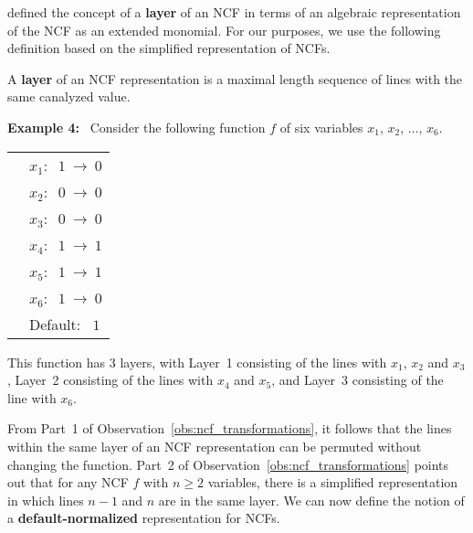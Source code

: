 \citet{Li-etal-2013} defined the concept of a 
{\bf layer} of an NCF in terms of
an algebraic representation of the NCF as an extended monomial.
For our purposes, we use the following definition based on the
simplified representation of NCFs.

\begin{definition}
\label{def:layer}
A {\bf layer} of an NCF representation is a maximal length sequence 
of lines with the same canalyzed value.
\end{definition}

\noindent
\textbf{Example 4:}~ Consider the following function $f$ of six variables
$x_1$, $x_2$, $\ldots$, $x_6$. 

\bigskip

\noindent
\begin{tabular}{ll}
\hspace*{0.25in} & $x_1:~$  $1 ~\longrightarrow~ 0$ \\ [0.5ex]
\hspace*{0.25in} & $x_2:~$  $0 ~\longrightarrow~ 0$ \\ [0.5ex]
\hspace*{0.25in} & $x_3:~$  $0 ~\longrightarrow~ 0$ \\ [0.5ex]
\hspace*{0.25in} & $x_4:~$  $1 ~\longrightarrow~ 1$ \\ [0.5ex]
\hspace*{0.25in} & $x_5:~$  $1 ~\longrightarrow~ 1$ \\ [0.5ex]
\hspace*{0.25in} & $x_6:~$  $1 ~\longrightarrow~ 0$ \\ [0.5ex]
\hspace*{0.25in} & Default:~ $1$ \\
\end{tabular}

\medskip
\noindent
This function has 3 layers, with 
Layer~1 consisting of the lines with $x_1$, $x_2$ and $x_3$, 
Layer~2 consisting of the lines with $x_4$ and $x_5$, and
Layer~3 consisting of the line with $x_6$.  %

\medskip
From Part~1 of Observation~\ref{obs:ncf_transformations},
it follows that the lines within the same layer of an NCF
representation can be permuted without changing the function.
Part~2 of Observation~\ref{obs:ncf_transformations} points
out that for any NCF $f$ with $n \geq 2$ variables, there is a simplified 
representation in which lines $n-1$ and $n$ are in the same layer.
We can now define the notion of a \textbf{default-normalized} 
representation for NCFs.

